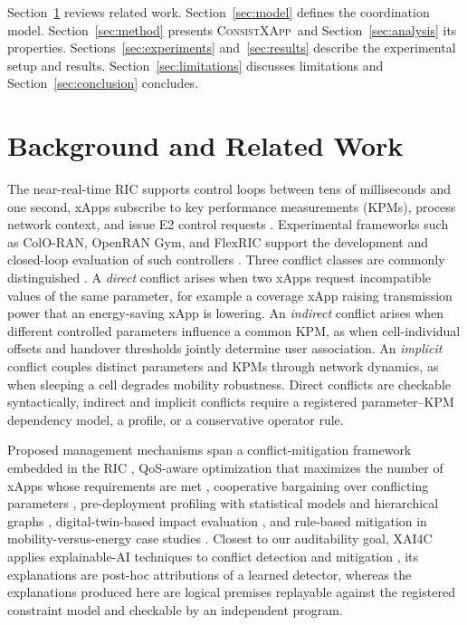 \documentclass[pdflatex,sn-mathphys-num,iicol,oneside]{sn-jnl}
\newcommand{\method}{\textsc{ConsistXApp}}
\begin{document}
Section~\ref{sec:background} reviews related work.
Section~\ref{sec:model} defines the coordination model.
Section~\ref{sec:method} presents \method\ and
Section~\ref{sec:analysis} its properties.
Sections~\ref{sec:experiments} and~\ref{sec:results} describe the
experimental setup and results. Section~\ref{sec:limitations}
discusses limitations and Section~\ref{sec:conclusion} concludes.

\section{Background and Related Work}
\label{sec:background}

The near-real-time RIC supports control loops between tens of
milliseconds and one second, xApps subscribe to key performance
measurements (KPMs), process network context, and issue E2 control
requests \cite{polese2023oran}. Experimental frameworks such as
ColO-RAN, OpenRAN Gym, and FlexRIC support the development and
closed-loop evaluation of such controllers
\cite{polese2022coloran,bonati2023openrangym,schmidt2021flexric}.
Three conflict classes are commonly distinguished
\cite{adamczyk2023conflict}. A \emph{direct} conflict arises when two
xApps request incompatible values of the same parameter, for example a
coverage xApp raising transmission power that an energy-saving xApp is
lowering. An \emph{indirect} conflict arises when different controlled
parameters influence a common KPM, as when cell-individual offsets and
handover thresholds jointly determine user association. An
\emph{implicit} conflict couples distinct parameters and KPMs through
network dynamics, as when sleeping a cell degrades mobility
robustness. Direct conflicts are checkable syntactically, indirect and
implicit conflicts require a registered parameter--KPM dependency
model, a profile, or a conservative operator rule.

Proposed management mechanisms span a conflict-mitigation framework
embedded in the RIC \cite{adamczyk2023conflict}, QoS-aware
optimization that maximizes the number of xApps whose requirements are
met \cite{wadud2024qacm,annals2024}, cooperative bargaining over
conflicting parameters \cite{wadud2023game}, pre-deployment profiling
with statistical models and hierarchical graphs
\cite{prever2025pacifista}, digital-twin-based impact evaluation
\cite{giannopoulos2025comix}, and rule-based mitigation in
mobility-versus-energy case studies \cite{wadud2025mobility}. Closest
to our auditability goal, XAI4C applies explainable-AI techniques to
conflict detection and mitigation \cite{varshney2025xai4c}, its
explanations are post-hoc attributions of a learned detector, whereas
the explanations produced here are logical premises replayable against
the registered constraint model and checkable by an independent
program.
\end{document}
